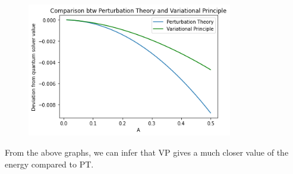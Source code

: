 \documentclass[12pt]{article}
\begin{document}
\newpage

\begin{figure}[h]
    \centering
    \includegraphics[width=0.8\textwidth]{Comparison btw VP and PT-2.png}
\end{figure}


From the above graphs, we can infer that VP gives a much closer value of the energy compared to PT. 
\end{document}
